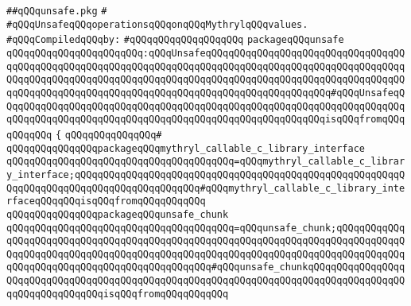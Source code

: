 \label{src/lib/std/src/unsafe/unsafe.pkg}
\verb|##qQQqunsafe.pkg|\newline
\verb|#|\newline
\verb|#qQQqUnsafeqQQqoperationsqQQqonqQQqMythrylqQQqvalues.|\newline
\newline
\verb|#qQQqCompiledqQQqby:|\newline
\verb|#qQQqqQQqqQQqqQQqqQQq|\newline
\newline
\newline
\newline
\verb|packageqQQqunsafe|\newline
\verb|qQQqqQQqqQQqqQQqqQQqqQQq:qQQqUnsafeqQQqqQQqqQQqqQQqqQQqqQQqqQQqqQQqqQQqqQQqqQQqqQQqqQQqqQQqqQQqqQQqqQQqqQQqqQQqqQQqqQQqqQQqqQQqqQQqqQQqqQQqqQQqqQQqqQQqqQQqqQQqqQQqqQQqqQQqqQQqqQQqqQQqqQQqqQQqqQQqqQQqqQQqqQQqqQQqqQQqqQQqqQQqqQQqqQQqqQQqqQQqqQQqqQQqqQQqqQQqqQQqqQQqqQQq#qQQqUnsafeqQQqqQQqqQQqqQQqqQQqqQQqqQQqqQQqqQQqqQQqqQQqqQQqqQQqqQQqqQQqqQQqqQQqqQQqqQQqqQQqqQQqqQQqqQQqqQQqqQQqqQQqqQQqqQQqqQQqqQQqqQQqqQQqisqQQqfromqQQqqQQqqQQq|\newline
\verb|{|\newline
\verb|qQQqqQQqqQQqqQQq#|\newline
\verb|qQQqqQQqqQQqqQQqpackageqQQqmythryl_callable_c_library_interface|\newline
\verb|qQQqqQQqqQQqqQQqqQQqqQQqqQQqqQQqqQQqqQQq=qQQqmythryl_callable_c_library_interface;qQQqqQQqqQQqqQQqqQQqqQQqqQQqqQQqqQQqqQQqqQQqqQQqqQQqqQQqqQQqqQQqqQQqqQQqqQQqqQQqqQQqqQQqqQQq#qQQqmythryl_callable_c_library_interfaceqQQqqQQqisqQQqfromqQQqqQQqqQQq|\newline
\newline
\verb|qQQqqQQqqQQqqQQqpackageqQQqunsafe_chunk|\newline
\verb|qQQqqQQqqQQqqQQqqQQqqQQqqQQqqQQqqQQqqQQq=qQQqunsafe_chunk;qQQqqQQqqQQqqQQqqQQqqQQqqQQqqQQqqQQqqQQqqQQqqQQqqQQqqQQqqQQqqQQqqQQqqQQqqQQqqQQqqQQqqQQqqQQqqQQqqQQqqQQqqQQqqQQqqQQqqQQqqQQqqQQqqQQqqQQqqQQqqQQqqQQqqQQqqQQqqQQqqQQqqQQqqQQqqQQqqQQqqQQqqQQq#qQQqunsafe_chunkqQQqqQQqqQQqqQQqqQQqqQQqqQQqqQQqqQQqqQQqqQQqqQQqqQQqqQQqqQQqqQQqqQQqqQQqqQQqqQQqqQQqqQQqqQQqqQQqqQQqqQQqisqQQqfromqQQqqQQqqQQq|\newline
